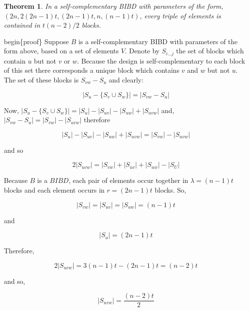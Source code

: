 \documentclass[
  11pt,
  a4paper]{book}
\newtheorem{theorem}{Theorem}
\begin{document}
\begin{theorem}
In a self-complementary BIBD with parameters of the form,
$(2n, 2(2n - 1)t, (2n - 1)t, n, (n - 1)t)$, every triple of
elements is contained in $t(n - 2)/2$ blocks.
\end{theorem}

begin\{proof\}
Suppose \(B\) is a self-complementary BIBD with parameters
of the form above, based on a set of elements \(V\). Denote
by \(S_{i\ldots j}\) the set of blocks which contain \(u\) but
not \(v\) or \(w\). Because the design is self-complementary to
each block of this set there corresponds a unique block
which contains \(v\) and \(w\) but not \(u\). The set of these
blocks is \(S_{vw} - S_u\) and clearly:

\begin{equation}
|S_u - \{S_v \cup S_w\}| = |S_{vw} - S_u|
\end{equation}

Now,
\(|S_u-\{S_v \cup S_w\}| = |S_u| - |S_{uv}| -|S_{uw}| + |S_{uvw}|\)
and,
\(|S_{vw} - S_u| = |S_{vw}| - |S_{uvw}|\)
therefore

\begin{equation}
|S_u| - |S_{uv}| -|S_{uw}| + |S_{uvw}| = |S_{vw}| - |S_{uvw}|
\end{equation}

and so

\begin{equation}
2|S_{uvw}| = |S_{vw}| + |S_{uv}| + |S_{uw}| - |S_{U}|
\end{equation}

Because \(B\) is a \(BIBD\), each pair of elements occur
together in \(\lambda = (n - 1)t\) blocks and each element
occurs in \(r =(2n - 1)t\) blocks. So,

\begin{equation}
|S_{vw}| = |S_{uv}| = |S_{uw}| = (n - 1)t
\end{equation}

and

\begin{equation}
|S_u| = (2n - 1)t
\end{equation}

Therefore,

\begin{equation}
2|S_{uvw}| = 3(n - 1)t - (2n  -1)t = (n - 2)t
\end{equation}

and so,

\begin{equation}
|S_{uvw}| = \frac{(n - 2)t}{2}
\end{equation}
\end{document}
